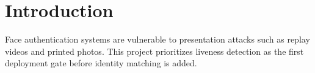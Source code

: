 \section{Introduction}
Face authentication systems are vulnerable to presentation attacks such as replay videos and printed photos. This project prioritizes liveness detection as the first deployment gate before identity matching is added.
